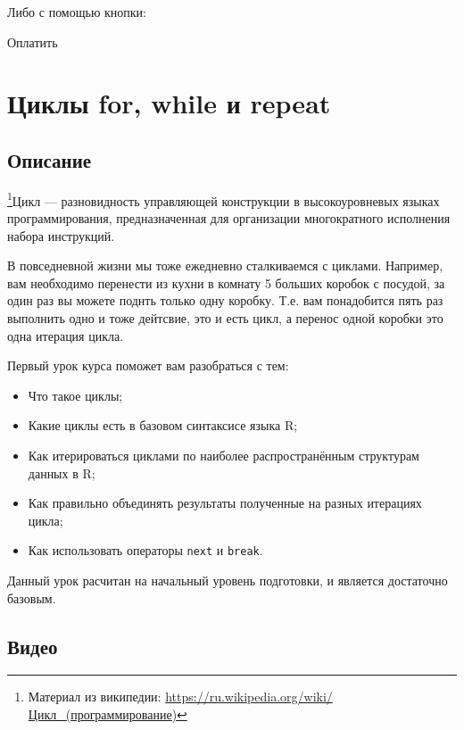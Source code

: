 \documentclass[
]{book}
\providecommand{\tightlist}{%
  \setlength{\itemsep}{0pt}\setlength{\parskip}{0pt}}
\begin{document}
Либо с помощью кнопки:

{Оплатить}

\hypertarget{ux446ux438ux43aux43bux44b-for-while-ux438-repeat}{%
\chapter{Циклы for, while и repeat}\label{ux446ux438ux43aux43bux44b-for-while-ux438-repeat}}

\hypertarget{ux43eux43fux438ux441ux430ux43dux438ux435}{%
\section{Описание}\label{ux43eux43fux438ux441ux430ux43dux438ux435}}

\footnote{Материал из википедии: \url{https://ru.wikipedia.org/wiki/Цикл_(программирование)}}Цикл --- разновидность управляющей конструкции в высокоуровневых языках программирования, предназначенная для организации многократного исполнения набора инструкций.

В повседневной жизни мы тоже ежедневно сталкиваемся с циклами. Например, вам необходимо перенести из кухни в комнату 5 больших коробок с посудой, за один раз вы можете поднть только одну коробку. Т.е. вам понадобится пять раз выполнить одно и тоже дейтсвие, это и есть цикл, а перенос одной коробки это одна итерация цикла.

Первый урок курса поможет вам разобраться с тем:

\begin{itemize}
\tightlist
\item
  Что такое циклы;
\item
  Какие циклы есть в базовом синтаксисе языка R;
\item
  Как итерироваться циклами по наиболее распространённым структурам данных в R;
\item
  Как правильно объединять результаты полученные на разных итерациях цикла;
\item
  Как использовать операторы \texttt{next} и \texttt{break}.
\end{itemize}

Данный урок расчитан на начальный уровень подготовки, и является достаточно базовым.

\hypertarget{ux432ux438ux434ux435ux43e}{%
\section{Видео}\label{ux432ux438ux434ux435ux43e}}
\end{document}
